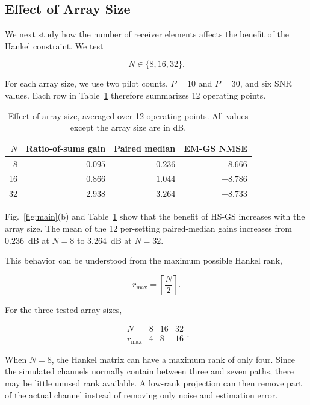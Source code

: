 \documentclass[journal]{IEEEtran}
\begin{document}
\subsection{Effect of Array Size}
\label{sec:aperture}

We next study how the number of receiver elements affects the benefit of
the Hankel constraint. We test

\begin{equation}
N\in\{8,16,32\}.
\end{equation}

For each array size, we use two pilot counts, $P=10$ and $P=30$, and six
SNR values. Each row in Table~\ref{tab:array} therefore summarizes
12 operating points.

\begin{table}[!t]
\caption{Effect of array size, averaged over 12 operating points. All
values except the array size are in dB.}
\label{tab:array}
\centering
\footnotesize
\setlength{\tabcolsep}{4pt}
\begin{tabular}{rrrr}
\toprule
$N$
& Ratio-of-sums gain
& Paired median
& EM-GS NMSE \\
\midrule
8  & $-0.095$ & $0.236$ & $-8.666$ \\
16 & $0.866$  & $1.044$ & $-8.786$ \\
32 & $2.938$  & $3.264$ & $-8.733$ \\
\bottomrule
\end{tabular}
\end{table}

Fig.~\ref{fig:main}(b) and Table~\ref{tab:array} show that the benefit of
HS-GS increases with the array size. The mean of the 12 per-setting
paired-median gains increases from
$0.236$~dB at $N=8$ to $3.264$~dB at $N=32$.

This behavior can be understood from the maximum possible Hankel rank,

\begin{equation}
r_{\max}
=
\left\lceil\frac{N}{2}\right\rceil.
\end{equation}

For the three tested array sizes,

\begin{equation}
\begin{array}{c|ccc}
N & 8 & 16 & 32 \\
\hline
r_{\max} & 4 & 8 & 16
\end{array}.
\end{equation}

When $N=8$, the Hankel matrix can have a maximum rank of only four. Since
the simulated channels normally contain between three and seven paths,
there may be little unused rank available. A low-rank projection can then
remove part of the actual channel instead of removing only noise and
estimation error.
\end{document}
